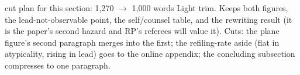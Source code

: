 \begin{ericbox}{cut plan for this section: 1,270 $\to$ 1,000 words}
Light trim. Keeps both figures, the lead-not-observable point, the
self/counsel table, and the rewriting result (it is the paper's second
hazard and RP's referees will value it). Cuts: the plane figure's second
paragraph merges into the first; the refiling-rate aside (flat in
atypicality, rising in lead) goes to the online appendix; the concluding
subsection compresses to one paragraph.
\end{ericbox}
